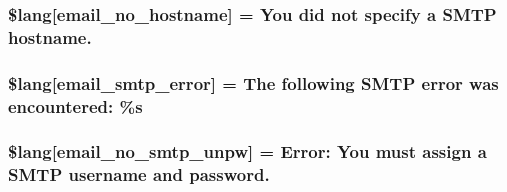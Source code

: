 \subsubsection[{\$lang}]{\setlength{\rightskip}{0pt plus 5cm}\$lang\mbox{[}\textquotesingle{}email\+\_\+no\+\_\+hostname\textquotesingle{}\mbox{]} = \textquotesingle{}You did not specify {\bf a} S\+M\+T\+P hostname.\textquotesingle{}}\label{_admin_2system_2language_2english_2email__lang_8php_a03905b414e05a5d3cfd0fe88868615f5}
\hypertarget{_admin_2system_2language_2english_2email__lang_8php_a3d70a704117491053ad9c0b4065ecd3f}{}
\subsubsection[{\$lang}]{\setlength{\rightskip}{0pt plus 5cm}\$lang\mbox{[}\textquotesingle{}email\+\_\+smtp\+\_\+error\textquotesingle{}\mbox{]} = \textquotesingle{}The following S\+M\+T\+P error was encountered\+: \%s\textquotesingle{}}\label{_admin_2system_2language_2english_2email__lang_8php_a3d70a704117491053ad9c0b4065ecd3f}
\hypertarget{_admin_2system_2language_2english_2email__lang_8php_a268c3e96fea16a903e7488f03960e89a}{}
\subsubsection[{\$lang}]{\setlength{\rightskip}{0pt plus 5cm}\$lang\mbox{[}\textquotesingle{}email\+\_\+no\+\_\+smtp\+\_\+unpw\textquotesingle{}\mbox{]} = \textquotesingle{}Error\+: You must assign {\bf a} S\+M\+T\+P username and password.\textquotesingle{}}\label{_admin_2system_2language_2english_2email__lang_8php_a268c3e96fea16a903e7488f03960e89a}
\hypertarget{_admin_2system_2language_2english_2email__lang_8php_a791781c2fd1bd8ec87158be649519621}{}
